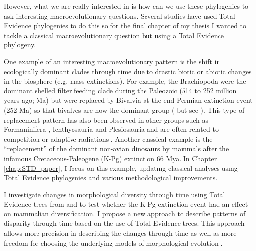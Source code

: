 
However, what we are really interested in is how can we use these phylogenies to ask interesting macroevolutionary questions.
Several studies have used Total Evidence phylogenies to do this %
so for the final chapter of my thesis I wanted to tackle a classical macroevolutionary question but using a Total Evidence phylogeny. 

One example of an interesting macroevolutionary pattern is the shift in ecologically dominant clades through time due to drastic biotic or abiotic changes in the biosphere (e.g. mass extinctions). %
For example, the Brachiopoda were the dominant shelled filter feeding clade during the Paleozoic (514 to 252 million years ago; Ma) but were replaced by Bivalvia at the end Permian extinction event (252 Ma) so that bivalves are now the dominant group (\citealt{Sepkiski1981,CLAPHAM01102006} but see \citealt{Payne22052014}).
This type of replacement pattern has also been observed in other groups such as Formaninifera \citep{Coxall01042006}, Ichthyosauria \citep{thorneresetting2011} and Plesiosauria \citealt{bensonfaunal2014} and are often related to competition \citep{brusatte50} or adaptive radiations \citep{Losos2010}.
Another classical example is the ``replacement'' of the dominant non-avian dinosaurs by mammals after the infamous Cretaceous-Paleogene (K-Pg) extinction 66 Mya.
In Chapter \ref{chap:STD_paper}, I focus on this example, updating classical analyses using Total Evidence phylogenies and various methodological improvements.

I investigate changes in morphological diversity \citep[or disparity;][]{Wills1994} through time using Total Evidence trees from \cite{slaterphylogenetic2013} and \cite{beckancient2014} to test whether the K-Pg extinction event had an effect on mammalian diversification.
I propose a new approach to describe patterns of disparity through time based on the use of Total Evidence trees.
This approach allows more precision in describing the changes through time as well as more freedom for choosing the underlying models of morphological evolution \citep[e.g. punctuated or gradual;][]{Hunt21042015}.

